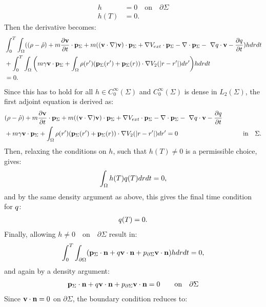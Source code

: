 \begin{align*}
h&=0 \quad \text{on} \quad \partial \Sigma\\
h(T)&=0.
\end{align*}
Then the derivative becomes:
\begin{align*}
 &\int_0^T \int_\Omega ( (\rho - \hat {\rho}) +m  \frac{\partial \mathbf{v}}{\partial t}\cdot \mathbf{p}_\Sigma + m  ((\mathbf{v} \cdot \nabla)\mathbf{v} )\cdot \mathbf{p}_\Sigma+ \nabla V_{ext}\cdot \mathbf{p}_\Sigma -\nabla\cdot \mathbf{p}_\Sigma  - \ \nabla q \cdot \mathbf{v}  -  \frac{\partial q}{\partial t}) h dr dt \\
 &+ \int_0^T \int_\Omega \bigg( m \gamma \mathbf{v} \cdot \mathbf{p}_\Sigma+ \int_\Omega  \rho(r')(\mathbf{p}_\Sigma(r') + \mathbf{p}_\Sigma(r)) \cdot\nabla V_2(|r-r'|)   dr'  \bigg)hdr dt\\
 &=0.
\end{align*}
Since this has to hold for all $h \in C_0^\infty(\Sigma)$ and $C_0^\infty(\Sigma)$ is dense in $L_2(\Sigma)$, the first adjoint equation is derived as:
\begin{align}
&(\rho - \hat {\rho}) +m  \frac{\partial \mathbf{v}}{\partial t}\cdot \mathbf{p}_\Sigma + m ( (\mathbf{v} \cdot \nabla)\mathbf{v}) \cdot \mathbf{p}_\Sigma+ \nabla V_{ext}\cdot \mathbf{p}_\Sigma -\nabla\cdot \mathbf{p}_\Sigma  - \ \nabla q \cdot \mathbf{v}  -  \frac{\partial q}{\partial t}\\
&+ m \gamma \mathbf{v} \cdot \mathbf{p}_\Sigma + \int_\Omega  \rho(r')(\mathbf{p}_\Sigma(r') + \mathbf{p}_\Sigma(r)) \cdot\nabla V_2(|r-r'|)   dr'  =0 \qquad\qquad\qquad\qquad\qquad \text{in} \quad \Sigma .\notag
\end{align}
Then, relaxing the conditions on $h$, such that $h(T) \neq 0$ is a permissible choice, gives:
\begin{align*}
\int_\Omega h(T) q(T) dr dt=0,
\end{align*}
and by the same density argument as above, this gives the final time condition for $q$:
\begin{align*}
q(T) = {0} .
\end{align*}
Finally, allowing $h \neq 0 \quad \text{on} \quad \partial \Sigma$ result in:
\begin{align*}
\int_0^T \int_{\partial \Omega} ( \mathbf{p}_\Sigma \cdot \mathbf{n}  +  q \mathbf{v} \cdot \mathbf{n}   +p_{\partial \Sigma} \mathbf{v} \cdot \mathbf{n})h  dr dt=0,
\end{align*}
and again by a density argument:
\begin{align*}
 \mathbf{p}_\Sigma \cdot \mathbf{n}  +  q \mathbf{v} \cdot \mathbf{n}   +p_{\partial \Sigma} \mathbf{v} \cdot \mathbf{n} = 0\qquad \text{on} \quad \partial \Sigma
\end{align*}
Since $\mathbf{v} \cdot \mathbf{n} =0$ on $ \partial \Sigma$, the boundary condition reduces to:
